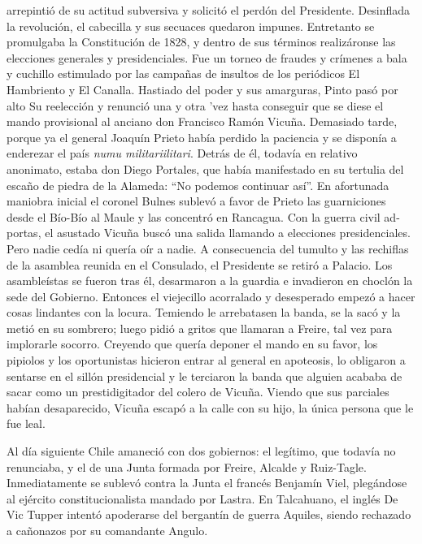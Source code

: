\documentclass[10pt,twoside,openright]{memoir}
\begin{document}
arrepintió de su actitud subversiva y solicitó el perdón del Presidente.
Desinflada la revolución, el cabecilla y sus secuaces quedaron impunes.
Entretanto se promulgaba la Constitución de 1828, y dentro de sus
términos realizáronse las elecciones generales y presidenciales. Fue un
torneo de fraudes y crímenes a bala y cuchillo estimulado por las
campañas de insultos de los periódicos El Hambriento y El Canalla.
Hastiado del poder y sus amarguras, Pinto pasó por alto Su reelección y
renunció una y otra 'vez hasta conseguir que se diese el mando
provisional al anciano don Francisco Ramón Vicuña. Demasiado tarde,
porque ya el general Joaquín Prieto había perdido la paciencia y se
disponía a enderezar el país \emph{numu militariilitari}. Detrás de él, todavía en
relativo anonimato, estaba don Diego Portales, que había manifestado en
su tertulia del escaño de piedra de la Alameda: ``No podemos continuar
así''. En afortunada maniobra inicial el coronel Bulnes sublevó a favor
de Prieto las guarniciones desde el Bío-Bío al Maule y las concentró en
Rancagua. Con la guerra civil ad-portas, el asustado Vicuña buscó una
salida llamando a elecciones presidenciales. Pero nadie cedía ni quería
oír a nadie. A consecuencia del tumulto y las rechiflas de la asamblea
reunida en el Consulado, el Presidente se retiró a Palacio. Los
asambleístas se fueron tras él, desarmaron a la guardia e invadieron en
choclón la sede del Gobierno. Entonces el viejecillo acorralado y
desesperado empezó a hacer cosas lindantes con la locura. Temiendo le
arrebatasen la banda, se la sacó y la metió en su sombrero; luego pidió
a gritos que llamaran a Freire, tal vez para implorarle socorro.
Creyendo que quería deponer el mando en su favor, los pipiolos y los
oportunistas hicieron entrar al general en apoteosis, lo obligaron a
sentarse en el sillón presidencial y le terciaron la banda que alguien
acababa de sacar como un prestidigitador del colero de Vicuña. Viendo
que sus parciales habían desaparecido, Vicuña escapó a la calle con su
hijo, la única persona que le fue leal.

Al día siguiente Chile amaneció con dos gobiernos: el legítimo, que
todavía no renunciaba, y el de una Junta formada por Freire, Alcalde y
Ruiz-Tagle. Inmediatamente se sublevó contra la Junta el francés
Benjamín Viel, plegándose al ejército constitucionalista mandado por
Lastra. En Talcahuano, el inglés De Vic Tupper intentó apoderarse del
bergantín de guerra Aquiles, siendo rechazado a cañonazos por su
comandante Angulo.
\end{document}
